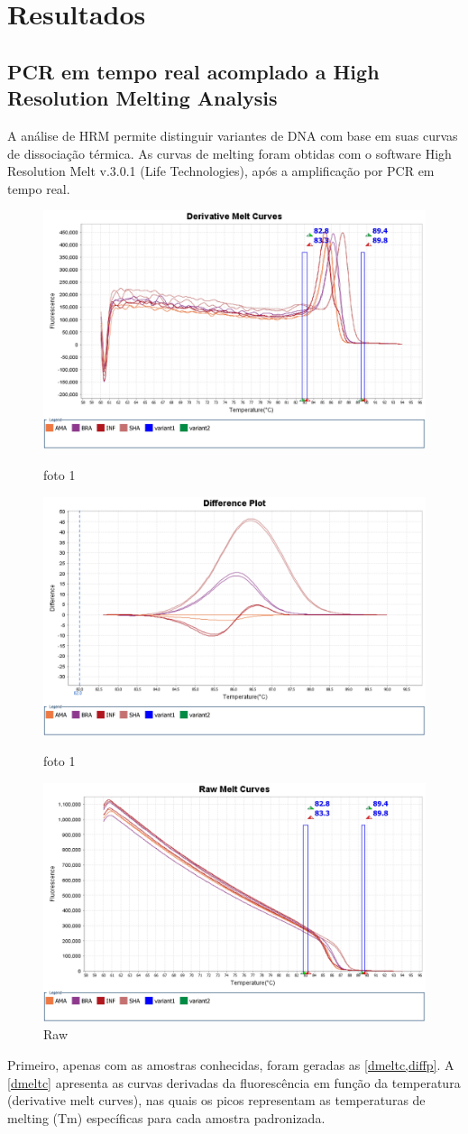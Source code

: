 \section{Resultados}
\subsection{PCR em tempo real acomplado a High Resolution Melting Analysis}
A análise de HRM permite distinguir variantes de DNA com base em suas curvas de
dissociação térmica. As curvas de melting foram obtidas com o software High
Resolution Melt v.3.0.1 (Life Technologies), após a amplificação por PCR em tempo real.

\begin{figure}
        \centering
        \includegraphics[width=.4\textwidth]{fig/Derivative Melt Curves.jpg}
        \caption{foto 1}
        \label{dmeltc}
        \includegraphics[width=.4\textwidth]{fig/Difference Plot.jpg}
        \caption{foto 1}
        \label{diffp}
        \includegraphics[width=.4\textwidth]{fig/Raw Melt Curves.jpg}
        \caption{Raw}
        \label{rawmelt}
\end{figure} %

Primeiro, apenas com as amostras conhecidas, foram geradas as
\cref{dmeltc,diffp}. A
\cref{dmeltc} apresenta as curvas derivadas da fluorescência em função da
temperatura (derivative melt curves), nas quais os picos representam as
temperaturas de melting (Tm) específicas para cada amostra padronizada.

